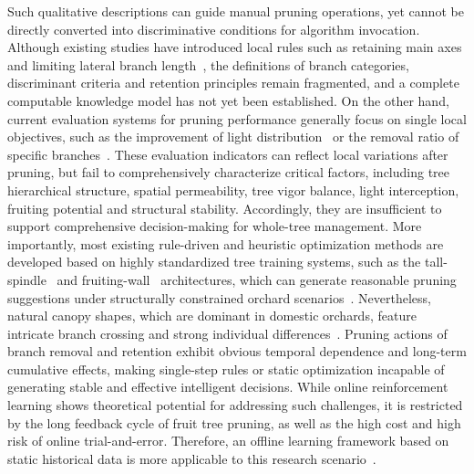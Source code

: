 \documentclass[12pt,a4paper,fontset=fandol]{ctexart}
\begin{document}
Such qualitative descriptions can guide manual pruning operations, yet cannot be directly converted into discriminative conditions for algorithm invocation.
Although existing studies have introduced local rules such as retaining main axes and limiting lateral branch length~\citep{robinson2017quantifying,flynn2024uncovering}, the definitions of branch categories, discriminant criteria and retention principles remain fragmented, and a complete computable knowledge model has not yet been established.
On the other hand, current evaluation systems for pruning performance generally focus on single local objectives, such as the improvement of light distribution~\citep{strnad2020framework,westling2021procedure} or the removal ratio of specific branches~\citep{karkee2014identification}.
These evaluation indicators can reflect local variations after pruning, but fail to comprehensively characterize critical factors, including tree hierarchical structure, spatial permeability, tree vigor balance, light interception, fruiting potential and structural stability.
Accordingly, they are insufficient to support comprehensive decision-making for whole-tree management.
More importantly, most existing rule-driven and heuristic optimization methods are developed based on highly standardized tree training systems, such as the tall-spindle~\citep{karkee2014identification} and fruiting-wall~\citep{he2022branch} architectures, which can generate reasonable pruning suggestions under structurally constrained orchard scenarios~\citep{strnad2020framework,strnad2021constrained}.
Nevertheless, natural canopy shapes, which are dominant in domestic orchards, feature intricate branch crossing and strong individual differences~\citep{borrenpohl2023automated,chen2023dwarf}.
Pruning actions of branch removal and retention exhibit obvious temporal dependence and long-term cumulative effects, making single-step rules or static optimization incapable of generating stable and effective intelligent decisions.
While online reinforcement learning shows theoretical potential for addressing such challenges, it is restricted by the long feedback cycle of fruit tree pruning, as well as the high cost and high risk of online trial-and-error.
Therefore, an offline learning framework based on static historical data is more applicable to this research scenario~\citep{levine2020offline}.
\end{document}
